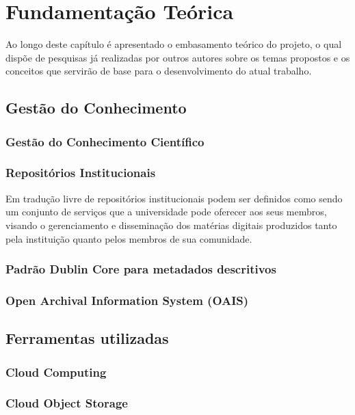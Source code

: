 
\chapter{Fundamentação Teórica}\label{chap:background}
Ao longo deste capítulo é apresentado o embasamento teórico do projeto,
o qual dispõe de pesquisas já realizadas por outros autores sobre os temas
propostos e os conceitos que servirão de base para o desenvolvimento do
atual trabalho.

\section{Gestão do Conhecimento}\label{sec:business}



\subsection{Gestão do Conhecimento Científico}
\subsection{Repositórios Institucionais}

Em tradução livre de \cite{LYNCH:2003} repositórios institucionais podem
ser definidos como sendo um conjunto de serviços que a universidade pode
oferecer aos seus membros, visando o gerenciamento e disseminação dos matérias
digitais produzidos tanto pela instituição quanto pelos membros de sua comunidade.



\subsection{Padrão Dublin Core para metadados descritivos}
\subsection{Open Archival Information System (OAIS)}

\section{Ferramentas utilizadas}\label{sec:fundamental}
\subsection{Cloud Computing}
\subsection{Cloud Object Storage}
